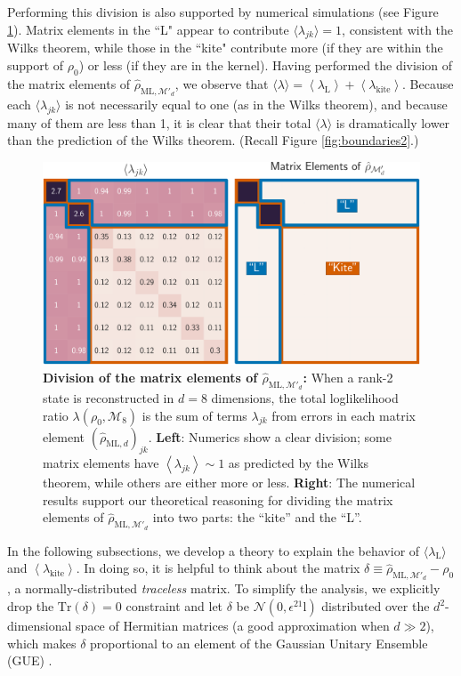 \documentclass[aps,pra, twocolumn]{revtex4-1}
\newcommand{\M}{\mathcal{M}}
\newcommand{\Tr}{\mathrm{Tr}}
\newcommand{\Id}{\mathbb{I}}
\newcommand{\expect}[1]{\ensuremath{\left\langle#1\right\rangle}}
\def\Id{1\!\mathrm{l}}
\newcommand{\rhohat}{\hat{\rho}}
\newcommand{\rhoML}[1]{\rhohat_{\scriptscriptstyle{\mathrm{ML},#1}}}
\begin{document}
Performing this division is also supported by numerical simulations (see Figure \ref{fig:L}). Matrix elements in the ``L" appear to contribute $\langle \lambda_{jk}\rangle = 1$, consistent with the Wilks theorem, while those in the ``kite" contribute more (if they are within the support of $\rho_{0}$) or less (if they are in the kernel).  Having performed the division of the matrix elements of $\rhoML{\M'_{d}}$, we observe that $\langle\lambda\rangle = \expect{\lambda_{\mathrm{L}}} + \expect{\lambda_{\mathrm{kite}}}$. Because each $\langle \lambda_{jk}\rangle$ is not necessarily equal to one (as in the Wilks theorem), and because many of them are less than 1, it is clear that their total $\langle \lambda \rangle$ is dramatically lower than the prediction of the Wilks theorem. (Recall Figure \ref{fig:boundaries2}.)

\begin{figure}
\includegraphics[width=\columnwidth]{Images/Figure_6.pdf}
 \caption{\textbf{Division of the matrix elements of $\rhoML{\M'_{d}}$:} When a rank-2 state is reconstructed in $d=8$ dimensions, the total loglikelihood ratio $\lambda(\rho_0,\mathcal{M}_8)$ is the sum of terms $\lambda_{jk}$ from errors in each matrix element $(\rhoML{d})_{jk}$.  \textbf{Left}:  Numerics show a clear division; some matrix elements have $\expect{\lambda_{jk}}\sim1$ as predicted by the Wilks theorem, while others are either more or less. \textbf{Right}:  The numerical results support our theoretical reasoning for dividing the matrix elements of $\rhoML{\M'_{d}}$ into two parts: the ``kite'' and the ``L''.}
\label{fig:L}
\end{figure}

In the following subsections, we develop a theory to explain the behavior of $\langle \lambda_{\mathrm{L}}\rangle$ and \expect{\lambda_{\mathrm{kite}}}.
In doing so, it is helpful to think about the matrix $\delta \equiv \rhoML{\M'_{d}}- \rho_{0}$, a normally-distributed \emph{traceless} matrix.  To simplify the analysis, we explicitly drop the $\Tr(\delta)=0$ constraint and let $\delta$ be $\mathcal{N}(0,\epsilon^2\Id)$ distributed over the $d^2$-dimensional space of Hermitian matrices (a good approximation when $d\gg2$), which makes $\delta$ proportional to an element of the Gaussian Unitary Ensemble (GUE) \cite{Fyodorov2005}.
\end{document}
